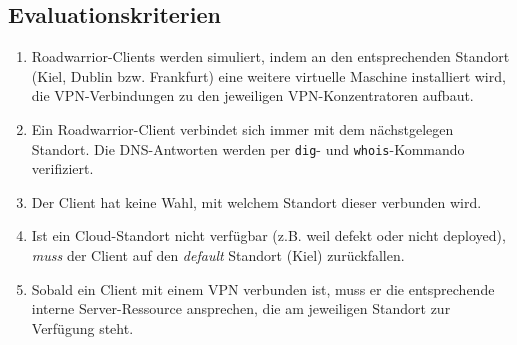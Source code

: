 \subsection{Evaluationskriterien}\label{eval-roadwarrior}
\begin{enumerate}
\item Roadwarrior-Clients werden simuliert, indem an den entsprechenden Standort (Kiel, Dublin bzw. Frankfurt) eine weitere virtuelle Maschine installiert wird, die VPN-Verbindungen zu den jeweiligen VPN-Konzentratoren aufbaut.
\item Ein Roadwarrior-Client verbindet sich immer mit dem nächstgelegen Standort. Die DNS-Antworten werden per \texttt{dig}- und \texttt{whois}-Kommando verifiziert.
\item Der Client hat keine Wahl, mit welchem Standort dieser verbunden wird.
\item Ist ein Cloud-Standort nicht verfügbar (z.B. weil defekt oder nicht deployed), \textit{muss} der Client auf den \textit{default} Standort (Kiel) zurückfallen.
\item Sobald ein Client mit einem VPN verbunden ist, muss er die entsprechende interne Server-Ressource ansprechen, die am jeweiligen Standort zur Verfügung steht.
\end{enumerate}
